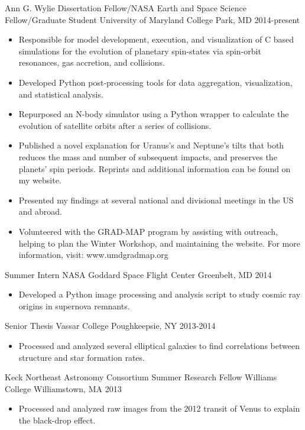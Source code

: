 \documentclass[]{awesome-cv}
\begin{document}
\begin{cventries}
	\cventry
	{Ann G. Wylie Dissertation Fellow/NASA Earth and Space Science Fellow/Graduate Student}
	{University of Maryland}
	{College Park, MD}
	{2014-present}
	{\vspace{-3mm}
		\begin{itemize}
			\item Responsible for model development, execution, and visualization of C based simulations for the evolution of planetary spin-states via spin-orbit resonances, gas accretion, and collisions.
			\item Developed Python post-processing tools for data aggregation, visualization, and statistical analysis.
			\item Repurposed an N-body simulator using a Python wrapper to calculate the evolution of satellite orbits after a series of collisions. 
			\item Published a novel explanation for Uranus's and Neptune's tilts that both reduces the mass and number of subsequent impacts, and preserves the planets' spin periods. Reprints and additional information can be found on my website.
			\item Presented my findings at several national and divisional meetings in the US and abroad. 
			\item Volunteered with the GRAD-MAP program by assisting with outreach, helping to plan the Winter Workshop, and maintaining the website. For more information, visit: www.umdgradmap.org
		\end{itemize}
	}

	\vspace{-6mm}
	\cventry
	{Summer Intern}
	{NASA Goddard Space Flight Center}
	{Greenbelt, MD}
	{2014}
	{\vspace{-3mm}
		\begin{itemize}
			\item Developed a Python image processing and analysis script to study cosmic ray origins in supernova remnants. 
	\end{itemize}
	}
	
	\vspace{-6mm}
	\cventry
	{Senior Thesis}
	{Vassar College}
	{Poughkeepsie, NY}
	{2013-2014}
	{\vspace{-3mm}
		\begin{itemize}
			\item Processed and analyzed several elliptical galaxies to find correlations between structure and star formation rates.
	\end{itemize}
	}
	
	\vspace{-6mm}
	\cventry
	{Keck Northeast Astronomy Consortium Summer Research Fellow}
	{Williams College}
	{Williamstown, MA}
	{2013}
	{\vspace{-3mm}
		\begin{itemize}
			\item Processed and analyzed raw images from the 2012 transit of Venus to explain the black-drop effect.
	\end{itemize}}
\end{cventries}
\end{document}
